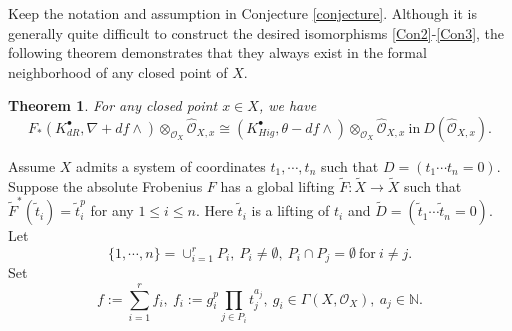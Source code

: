 \documentclass[12pt, a4paper]{article}
\newtheorem{theorem}{Theorem}[section]
\begin{document}
\iffalse
Keep the notation and assumption in Conjecture \ref{conjecture}. Although it is generally quite difficult to construct the desired isomorphisms \eqref{Con2}-\eqref{Con3}, the following theorem demonstrates that they always exist in the formal neighborhood of any closed point of $X$.
\begin{theorem}\label{main A}
For any closed point $x\in X$, we have
$$F_*(K^\bullet_{dR},\nabla+df\wedge)\otimes_{\mathcal O_X}\hat{\mathcal O}_{X,x}\cong(K^\bullet_{Hig},\theta-df\wedge)\otimes_{\mathcal O_X}\hat{\mathcal O}_{X,x}~\mathrm{in}~D(\hat{\mathcal O}_{X,x}).$$
\end{theorem}
\iffalse
Assume $X$ admits a system of coordinates $t_1,\cdots,t_n$ such that $D=(t_1\cdots t_n=0)$. Suppose the absolute Frobenius $F$ has a global lifting $\tilde F:\tilde X\to\tilde X$ such that $\tilde F^*(\tilde t_i)=\tilde t_i^p$ for any $1\leq i\leq n$. Here $\tilde t_i$ is a lifting of $t_i$ and $\tilde D=(\tilde t_1\cdots\tilde t_n=0)$. Let 
$$
\{1,\cdots,n\}=\cup_{i=1}^rP_i,~P_i\neq\emptyset,~P_i\cap P_j=\emptyset~\mathrm{for}~i\neq j.
$$
Set
$$
f:=\sum_{i=1}^rf_i,~f_i:=g_i^p\prod_{j\in P_i}t_j^{a_j},~g_i\in\Gamma(X,\mathcal O_X),~a_j\in\mathbb N.
$$
\end{document}
